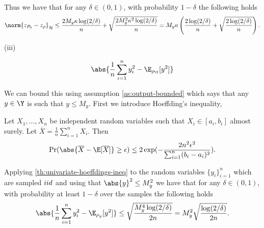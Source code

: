 Thus we have that for any \(\delta \in (0, 1)\), with  probability \(1 -
\delta\) the following holds
\begin{equation}
  \label{eq:zs_RKHS_hoeffding}
  \norm{z_{\poolset_0} - z_{\rho}}_{\rkhs{H}} \leq \frac{2 M_y \kappa \log(2/\delta)}{n} + \sqrt{\frac{2 M_y^2 \kappa^2 \log(2/\delta)}{n}} = M_y \kappa \left(\frac{2\log(2/\delta)}{n} + \sqrt{\frac{2\log(2/\delta)}{n}} \right).
\end{equation}


\begin{description}
\item[{(iii)}] 
\end{description}
\begin{equation*}
  \abs{\frac{1}{n} \sum_{i=1}^n y_i^2 - \E_{\rho_{\Y}}[y^2]}
\end{equation*}

We can bound this using assumption \ref{as:output-bounded} which says that any
\(y \in \Y\) is such that \(y \leq M_y\). First we introduce Hoeffding's inequality,
\begin{theorem}
  \label{th:univariate-hoeffdings-ineq}
  Let \(X_{1}, \dots, X_{n}\) be independent random variables such that \(X_{i}
  \in [a_{i}, b_{i}]\) almost surely. Let \(\overline{X} = \frac{1}{n}
  \sum_{i=1}^n X_i\). Then
  \begin{equation}
    \label{eq:univariate-hoeffdings-ineq}
    \Pr(\abs{\overline{X} - \E[\overline{X}]} \geq \epsilon) \leq 2 \exp(-\frac{2n^2\epsilon^2}{\sum_{i=1}^n(b_i - a_i)^2}).
  \end{equation}
\end{theorem}
Applying \ref{th:univariate-hoeffdings-ineq} to the random variables
\(\{y_{i}\}_{i=1}^{n}\) which are sampled \(iid\) and using that \(\abs{y}^{2}
\leq M_{y}^{2}\) we have that for any \(\delta \in (0, 1)\), with probability at
least \(1 - \delta\) over the samples the following holds
\begin{equation}
  \label{eq:y2s_hoeffding}
  \abs{\frac{1}{n} \sum_{i=1}^n y_i^2 - \E_{\rho_{y}}[y^2]} \leq \sqrt{\frac{M_y^4 \log(2/\delta)}{2n}} = M_y^2\sqrt{\frac{\log(2/\delta)}{2n}}.
\end{equation}

